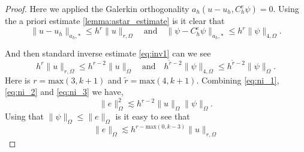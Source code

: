 \begin{proof}
        Here we applied the Galerkin orthogonality $ a_{h}( u-u_{h}, C^{e}_{h}\psi ) = 0$.
        Using the a priori estimate \eqref{lemma:astar_estimate}  is it clear that
        \begin{equation}
            \label{eq:ni_2}
        \|u-u_{h}  \|_{a_{h},*  }^{  }  \le h^{r} \| u \|_{r,\Omega  }^{  }\quad  \text{and}\quad  \| \psi  - C^{e}_{h}\psi \|_{a_{h},*  }^{  }  \le h^{r} \| \psi  \|_{4, \Omega   }^{  }.
        \end{equation}

        And then standard inverse estimate \eqref{eq:inv1} can we see
        \begin{equation}
            \label{eq:ni_3}
             h^{r} \| u \|_{r,\Omega  }^{  }  \le h^{r-2} \| u \|_{\Omega  }^{  } \quad  \text{and}\quad  h^{\widetilde{r} -2} \| \psi  \|_{4,\Omega  }^{  }  \le h^{\widetilde{r}-2} \| \psi  \|_{\Omega }^{  }.
        \end{equation}
        Here is $r = \mathrm{max}(3,k+1)$ and $ \widetilde{r} = \mathrm{max}(4,k+1)$.
        Combining \eqref{eq:ni_1}, \eqref{eq:ni_2} and \eqref{eq:ni_3} we have, \begin{equation}
            \| e \|_{\Omega   }^{ 2 } \lesssim  h^{r-2} \| u \|_{\Omega   }^{  } \|  \psi \|_{ \Omega  }^{  }.
        \end{equation}
        Using that $\| \psi  \|_{ \Omega  }^{  } \le \| e \|_{ \Omega   }^{  }  $ is it easy to see that \begin{equation}
            \| e \|_{\Omega   }^{  } \lesssim  h^{r- \mathrm{max}(0, k-3) } \| u \|_{r, \Omega   }^{  }
        \end{equation}

\end{proof}


